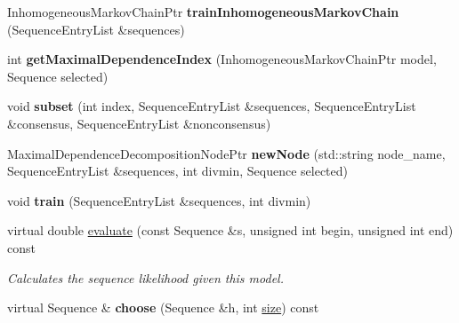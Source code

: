 \begin{DoxyCompactItemize}
Inhomogeneous\+Markov\+Chain\+Ptr {\bfseries train\+Inhomogeneous\+Markov\+Chain} (Sequence\+Entry\+List \&sequences)
\item 
\mbox{\label{classtops_1_1MaximalDependenceDecomposition_a6ebc731f2525f08fde763f3ae5de2278}} 
int {\bfseries get\+Maximal\+Dependence\+Index} (Inhomogeneous\+Markov\+Chain\+Ptr model, Sequence selected)
\item 
\mbox{\label{classtops_1_1MaximalDependenceDecomposition_a0df44c81d935c029af9e52000b7f39a5}} 
void {\bfseries subset} (int index, Sequence\+Entry\+List \&sequences, Sequence\+Entry\+List \&consensus, Sequence\+Entry\+List \&nonconsensus)
\item 
\mbox{\label{classtops_1_1MaximalDependenceDecomposition_ab4ea18a665ae197778fa7b6ac4db186b}} 
Maximal\+Dependence\+Decomposition\+Node\+Ptr {\bfseries new\+Node} (std\+::string node\+\_\+name, Sequence\+Entry\+List \&sequences, int divmin, Sequence selected)
\item 
\mbox{\label{classtops_1_1MaximalDependenceDecomposition_aed945c7b2f4fa83ac57198ce028bb12b}} 
void {\bfseries train} (Sequence\+Entry\+List \&sequences, int divmin)
\item 
\mbox{\label{classtops_1_1MaximalDependenceDecomposition_a62e88dbda53f91076128a5879bb28b19}} 
virtual double \hyperlink{classtops_1_1MaximalDependenceDecomposition_a62e88dbda53f91076128a5879bb28b19}{evaluate} (const Sequence \&s, unsigned int begin, unsigned int end) const
\begin{DoxyCompactList}\small\item\em Calculates the sequence likelihood given this model. \end{DoxyCompactList}\item 
\mbox{\label{classtops_1_1MaximalDependenceDecomposition_ad1a77fe38770bfd76200155c54797122}} 
virtual Sequence \& {\bfseries choose} (Sequence \&h, int \hyperlink{classtops_1_1ProbabilisticModel_a4e3910e9b9b848b7078e7101909ae82a}{size}) const
\item 

\end{DoxyCompactItemize}
